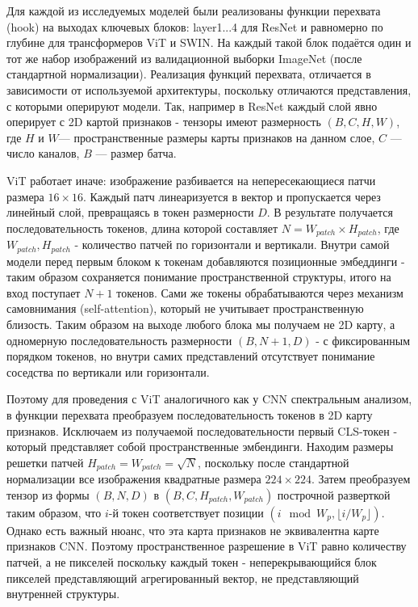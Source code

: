 Для каждой из исследуемых моделей были реализованы функции перехвата (hook) на выходах ключевых блоков: layer1...4 для ResNet и равномерно по глубине для трансформеров ViT и SWIN. На каждый такой блок подаётся один и тот же набор изображений из валидационной выборки ImageNet \cite{priyerana_imagenet10k} (после стандартной нормализации). 
Реализация функций перехвата, отличается в зависимости от используемой архитектуры, поскольку отличаются представления, с которыми оперируют модели. Так, например в ResNet каждый слой явно оперирует с 2D картой признаков - тензоры имеют размерность $(B, C, H, W)$, где $H$ и $W$— пространственные размеры карты признаков на данном слое, $C$ — число каналов, $B$ — размер батча. 

ViT работает иначе: изображение разбивается на непересекающиеся патчи размера $16\times16$. Каждый патч линеаризуется в вектор и пропускается через линейный слой, превращаясь в токен размерности $D$. В результате получается последовательность токенов, длина которой составляет $N = W_{patch}\times H_{patch}$, где $W_{patch}, H_{patch}$ - количество патчей по горизонтали и вертикали. Внутри самой модели перед первым блоком к токенам добавляются позиционные эмбеддинги - таким образом сохраняется понимание пространственной структуры, итого на вход поступает $N+1$ токенов. Сами же токены обрабатываются через механизм самовнимания (self-attention), который не учитывает пространственную близость. Таким образом на выходе любого блока мы получаем не 2D карту, а одномерную последовательность размерности $(B, N+1,D)$ - с фиксированным порядком токенов, но внутри самих представлений отсутствует понимание соседства по вертикали или горизонтали. 

Поэтому для проведения с ViT аналогичного как у CNN спектральным анализом, в функции перехвата преобразуем последовательность токенов в 2D карту признаков. Исключаем из получаемой последовательности первый CLS-токен - который представляет собой пространственные эмбендинги. Находим размеры решетки патчей $H_{patch} = W_{patch} = \sqrt{N}$, поскольку после стандартной нормализации все изображения квадратные размера $224\times 224$. Затем преобразуем тензор из формы $(B, N, D)$ в $(B, C, H_{patch}, W_{patch})$ построчной разверткой таким образом, что $i$-й токен соответствует позиции $(i\mod W_p ,\lfloor i / W_p \rfloor)$. Однако есть важный нюанс, что эта карта признаков не эквивалентна карте признаков CNN. Поэтому пространственное разрешение в ViT равно количеству патчей, а не пикселей поскольку каждый токен - неперекрывающийся блок пикселей представляющий агрегированный вектор, не представляющий внутренней структуры.

